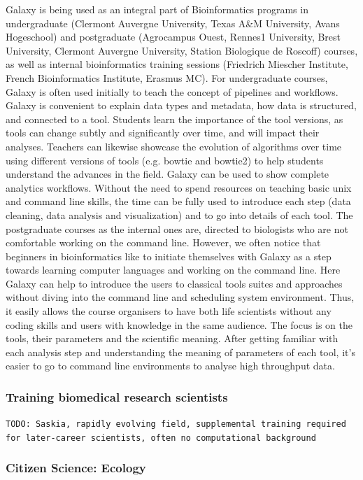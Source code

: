 \documentclass[10pt,letterpaper]{article}
\begin{document}
Galaxy is being used as an integral part of Bioinformatics programs in undergraduate (Clermont Auvergne University, Texas A\&M University, Avans Hogeschool) and postgraduate (Agrocampus Ouest, Rennes1 University, Brest University, Clermont Auvergne University, Station Biologique de Roscoff) courses, as well as internal bioinformatics training sessions (Friedrich Miescher Institute, French Bioinformatics Institute, Erasmus MC).
For undergraduate courses, Galaxy is often used initially to teach the concept of pipelines and workflows.
Galaxy is convenient to explain data types and metadata, how data is structured, and connected to a tool.
Students learn the importance of the tool versions, as tools can change subtly and significantly over time, and will impact their analyses. Teachers can likewise showcase the evolution of algorithms over time using different versions of tools (e.g. bowtie and bowtie2) to help students understand the advances in the field. Galaxy can be used to show complete analytics workflows.
Without the need to spend resources on teaching basic unix and command line skills, the time can be fully used to introduce each step (data cleaning, data analysis and visualization) and to go into details of each tool.
The postgraduate courses as the internal ones are, directed to biologists who are not comfortable working on the command line.
However, we often notice that beginners in bioinformatics like to initiate themselves with Galaxy as a step towards learning computer languages and working on the command line.
Here Galaxy can help to introduce the users to classical tools suites and approaches without diving into the command line and scheduling system environment.
Thus, it easily allows the course organisers to have both life scientists without any coding skills and users with knowledge in the same audience. The focus is on the tools, their parameters and the scientific meaning.
After getting familiar with each analysis step and understanding the meaning of parameters of each tool, it’s easier to go to command line environments to analyse high throughput data.


\subsubsection*{Training biomedical research scientists}

\verb+TODO: Saskia, rapidly evolving field, supplemental training required for later-career scientists, often no computational background+

\subsubsection*{Citizen Science: Ecology}
\end{document}
